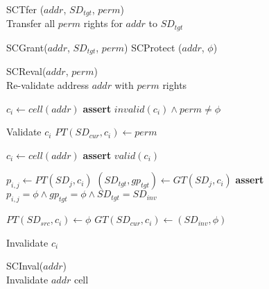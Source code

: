 \begin{figure*}[!t]
\begin{multicols}{2}
    \begin{algorithm}[H]
      \caption{SCTfer ($addr$, $SD_{tgt}$, $perm$) \\
      Transfer all $perm$ rights for $addr$ to $SD_{tgt}$    }
      \begin{algorithmic}[1]
        \State SCGrant($addr$, $SD_{tgt}$, $perm$)
        \State SCProtect ($addr$, $\phi$)
      \end{algorithmic}
      \label{alg:tfer}
    \end{algorithm}
    \vspace{-1.5\baselineskip}

    \begin{algorithm}[H]
      \caption{SCReval($addr$, $perm$)  \\
      Re-validate address $addr$ with $perm$ rights}
      \begin{algorithmic}[1]

        \State $c_i \gets cell(addr)$
        \State \textbf{assert} $invalid(c_i) \land perm \ne \phi$

        \State Validate $c_i$
        \State $PT(SD_{cur}, c_i) \gets perm$

      \end{algorithmic}
      \label{alg:screval}
    \end{algorithm}
    \vspace{-1.5\baselineskip}

    \begin{algorithm}[H]
      \caption{SCInval($addr$)  \\
      Invalidate $addr$ cell}
      \begin{algorithmic}[1]

        \State $c_i \gets cell(addr)$
        \State \textbf{assert} $valid(c_i)$

          \State $p_{i, j} \gets PT(SD_j, c_i)$
          \State $(SD_{tgt}, gp_{tgt}) \gets GT(SD_j, c_i)$
          \State \textbf{assert} $p_{i,j} = \phi \land gp_{tgt} = \phi \land SD_{tgt} = SD_{inv}$
        \EndFor

        \State $PT(SD_{src}, c_i) \gets \phi$
        \State $GT(SD_{cur}, c_i) \gets (SD_{inv}, \phi)$

        \State Invalidate $c_i$
      \end{algorithmic}
      \label{alg:scinval}
    \end{algorithm}
    \vspace{-1.5\baselineskip}


\end{multicols}
\end{figure*}

